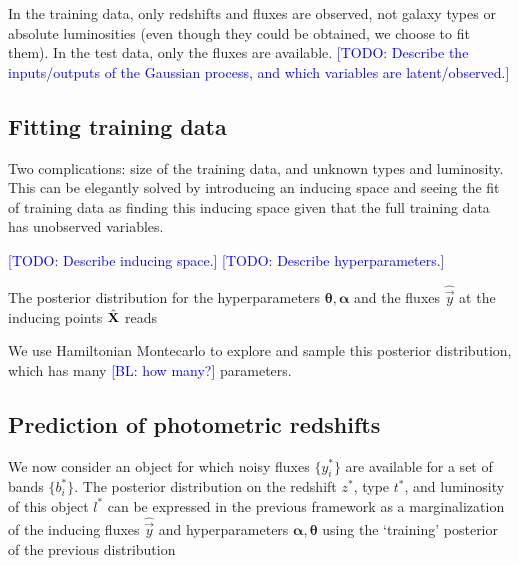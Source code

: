 \documentclass[aps,prd,showpacs,superscriptaddress,groupedaddress]{revtex4}  %
\newcommand{\todo}[1]{\textcolor{blue}{[TODO: #1]}}
\newcommand{\bl}[1]{\textcolor{blue}{[BL: #1]}}
\begin{document}
In the training data, only redshifts and fluxes are observed, not galaxy types or absolute luminosities (even though they could be obtained, we choose to fit them). 
In the test data, only the fluxes are available.
\todo{Describe the inputs/outputs of the Gaussian process, and which variables are latent/observed.}

\subsection{Fitting training data}


Two complications: size of the training data, and unknown types and luminosity. 
This can be elegantly solved by introducing an inducing space and seeing the fit of training data as finding this inducing space given that the full training data has unobserved variables.

\todo{Describe inducing space.}
\todo{Describe hyperparameters.}

The posterior distribution for the hyperparameters $\bm{\theta}, \bm{\alpha}$ and the fluxes $\hat{\vec{y}}$ at the inducing points $\hat{\mat{X}}$ reads

We use Hamiltonian Montecarlo to explore and sample this posterior distribution, which has many \bl{how many?} parameters.

\subsection{Prediction of photometric redshifts}

We now consider an object for which noisy fluxes $\{ y_i^* \}$ are available for a set of bands $\{ b_i^* \}$. 
The posterior distribution on the redshift $z^*$, type $t^*$, and luminosity of this object $l^*$ can be expressed in the previous framework as a marginalization of the inducing fluxes $\hat{\vec{y}}$ and hyperparameters $\bm{\alpha}, \bm{\theta}$ using the `training' posterior of the previous distribution
 
\end{document}

